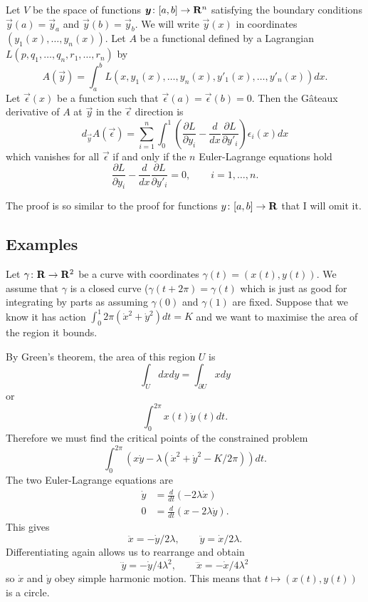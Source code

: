 \begin{thm}
Let $V$ be the space of functions $\boldsymbol{y}\colon [a,b]\to\mathbf{R}^n$ satisfying the boundary conditions $\vec{y}(a)=\vec{y}_a$ and $\vec{y}(b)=\vec{y}_b$. We will write $\vec{y}(x)$ in coordinates $(y_1(x),\ldots,y_n(x))$. Let $A$ be a functional defined by a Lagrangian $L(p,q_1,\ldots,q_n,r_1,\ldots,r_n)$ by
\[A(\vec{y})=\int_a^bL(x,y_1(x),\ldots,y_n(x),y'_1(x),\ldots,y'_n(x))dx.\]
Let $\vec{\epsilon}(x)$ be a function such that $\vec{\epsilon}(a)=\vec{\epsilon}(b)=0$. Then the G\^{a}teaux derivative of $A$ at $\vec{y}$ in the $\vec{\epsilon}$ direction is
\[d_{\vec{y}}A(\vec{\epsilon})=\sum_{i=1}^n\int_0^1\left(\frac{\partial L}{\partial y_i}-\frac{d}{dx}\frac{\partial L}{\partial y'_i}\right)\epsilon_i(x)dx\]
which vanishes for all $\vec{\epsilon}$ if and only if the $n$ Euler-Lagrange equations hold
\[\frac{\partial L}{\partial y_i}-\frac{d}{dx}\frac{\partial L}{\partial y'_i}=0,\qquad i=1,\ldots,n.\]
\end{thm}
The proof is so similar to the proof for functions $y\colon[a,b]\to\mathbf{R}$ that I will omit it.

\subsection{Examples}

\begin{exm}
Let $\gamma\colon\mathbf{R}\to\mathbf{R}^2$ be a curve with coordinates $\gamma(t)=(x(t),y(t))$. We assume that $\gamma$ is a closed curve ($\gamma(t+2\pi)=\gamma(t)$ which is just as good for integrating by parts as assuming $\gamma(0)$ and $\gamma(1)$ are fixed. Suppose that we know it has action $\int_0^1{2\pi}(\dot{x}^2+\dot{y}^2)dt=K$ and we want to maximise the area of the region it bounds.

By Green's theorem, the area of this region $U$ is
\[\int_Udxdy=\int_{\partial U}xdy\]
or
\[\int_0^{2\pi}x(t)\dot{y}(t)dt.\]
Therefore we must find the critical points of the constrained problem
\[\int_0^{2\pi}\left(x\dot{y}-\lambda\left(\dot{x}^2+\dot{y}^2-K/2\pi\right)\right)dt.\]
The two Euler-Lagrange equations are
\begin{align*}
\dot{y}&=\frac{d}{dt}\left(-2\lambda\dot{x}\right)\\
0&=\frac{d}{dt}\left(x-2\lambda\dot{y}\right).
\end{align*}
This gives
\[\ddot{x}=-\dot{y}/2\lambda,\qquad\ddot{y}=\dot{x}/2\lambda.\]
Differentiating again allows us to rearrange and obtain
\[\dddot{y}=-\dot{y}/4\lambda^2,\qquad\dddot{x}=-\dot{x}/4\lambda^2\]
so $\dot{x}$ and $\dot{y}$ obey simple harmonic motion. This means that $t\mapsto(x(t),y(t))$ is a circle.
\end{exm}

